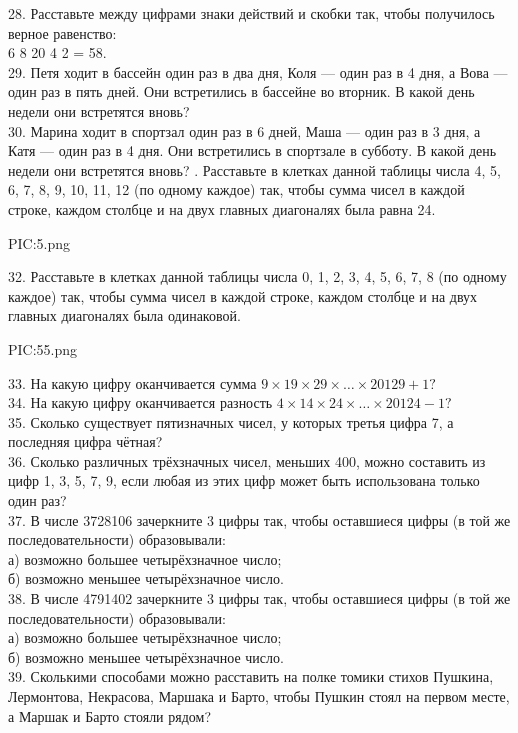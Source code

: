 28. Расставьте между цифрами знаки действий и скобки так, чтобы получилось верное равенство:\\ 6 8 20 4 2 = 58.\\
29. Петя ходит в бассейн один раз в два дня, Коля --- один раз в 4 дня, а Вова --- один раз в пять дней. Они встретились в бассейне во вторник. В какой день недели они встретятся вновь?\\
30. Марина ходит в спортзал один раз в 6 дней, Маша --- один раз в 3 дня, а Катя --- один раз в 4 дня. Они встретились в спортзале в субботу. В какой день недели они встретятся вновь?
\newpage
{}. Расставьте в клетках данной таблицы числа 4, 5, 6, 7, 8, 9, 10, 11, 12 (по одному каждое) так, чтобы сумма чисел в каждой строке, каждом столбце и на двух главных диагоналях была равна 24.
\begin{center}
{{PIC:5.png}}
\end{center}
32. Расставьте в клетках данной таблицы числа 0, 1, 2, 3, 4, 5, 6, 7, 8 (по одному каждое) так, чтобы сумма чисел в каждой строке, каждом столбце и на двух главных диагоналях была одинаковой.
\begin{center}
{{PIC:55.png}}
\end{center}
33. На какую цифру оканчивается сумма $9\times19\times29\times\ldots\times20129+1?$\\
34. На какую цифру оканчивается разность $4\times14\times24\times\ldots\times20124-1?$\\
35. Сколько существует пятизначных чисел, у которых третья цифра 7, а последняя цифра чётная?\\
36. Сколько различных трёхзначных чисел, меньших 400, можно составить из цифр 1, 3, 5, 7, 9, если любая из этих цифр может быть использована только один раз?\\
37. В числе 3728106 зачеркните 3 цифры так, чтобы оставшиеся цифры (в той же последовательности) образовывали:\\
а) возможно большее четырёхзначное число;\\
б) возможно меньшее четырёхзначное число.\\
38. В числе 4791402 зачеркните 3 цифры так, чтобы оставшиеся цифры (в той же последовательности) образовывали:\\
а) возможно большее четырёхзначное число;\\
б) возможно меньшее четырёхзначное число.\\
39. Сколькими способами можно расставить на полке томики стихов Пушкина, Лермонтова, Некрасова, Маршака и Барто, чтобы Пушкин стоял на первом месте, а Маршак и Барто стояли рядом?\\
